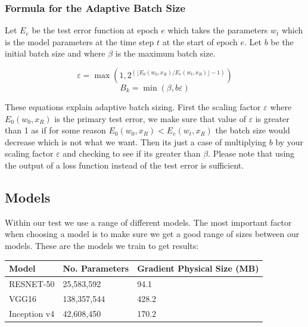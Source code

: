 \documentclass[twocolumn,10pt]{article}
\begin{document}
\subsubsection{Formula for the Adaptive Batch Size}

Let $E_e$ be the test error function at epoch $e$ which takes the parameters $w_t$ which is the model parameters at the time step $t$ at the start of epoch $e$. Let $b$ be the initial batch size and where $\beta$ is the maximum batch size.  

\begingroup
\Large
$$
\varepsilon = \max \left(1, 2^{(\lfloor E_0(w_0,x_R)/E_e(w_t, x_R) \rfloor -1)} \right)
$$
$$
B_k = \min \left(\beta,b\varepsilon\right)
$$
\endgroup

These equations explain adaptive batch sizing. First the scaling factor $\varepsilon$ where $E_0(w_0,x_R)$ is the primary test error, we make sure that value of $\varepsilon$ is greater than 1 as if for some reason $E_0(w_0,x_R) < E_e(w_t, x_R)$ the batch size would decrease which is not what we want. Then its just a case of multiplying $b$ by your scaling factor $\varepsilon$ and checking to see if its greater than $\beta$. Please note that using the output of a loss function instead of the test error is sufficient.


\subsection{Models}
Within our test we use a range of different models. The most important factor when choosing a model is to make sure we get a good range of sizes between our models. These are the models \cite{he2016deep,simonyan2014very,szegedy2017inception} we train to get results:

\begin{center}
\begin{tabular}{| p{2.2cm} | p{2.2cm} | p{2.2cm} |} 
\hline
Model & No. Parameters &  Gradient Physical Size (MB)\\ \hline
RESNET-50 & 25,583,592 &  94.1 \\ \hline
VGG16 &  138,357,544 &  428.2 \\ \hline
Inception v4 & 42,608,450 &  170.2\\ \hline
\end{tabular}
\end{center}
\end{document}
